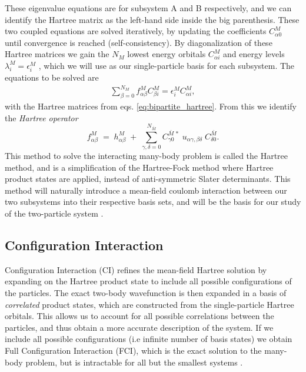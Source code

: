 \documentclass{subfiles}
\begin{document}
These eigenvalue equations are for subsystem A and B respectively, and we can identify the Hartree matrix as the left-hand side inside the big parenthesis. These two coupled equations are solved iteratively, by updating the coefficients $C_{\alpha 0}^M$ until convergence is reached (self-consistency). By diagonalization of these Hartree matrices we gain the $N_M$ lowest energy orbitals $C^M_{\alpha i}$ and energy levels $\lambda^M_i=\epsilon^M_i$ \cite{leinonen2024coulomb}, which we will use as our single-particle basis for each subsystem. The equations to be solved are
\begin{align}
    \sum_{\beta=0}^{N_M} f_{\alpha\beta}^M C^M_{\beta i} = \epsilon_i^M C^M_{\alpha i}\label{eq:hartree_eigenvalue},
\end{align}
with the Hartree matrices from eqs. \eqref{eq:bipartite_hartree}. From this we identify the \emph{Hartree operator}
\begin{equation}
    f_{\alpha\beta}^M \;=\; h_{\alpha\beta}^M
    \;+\;\sum_{\gamma,\delta=0}^{N_{\bar M}}
      C_{\gamma0}^{\bar M\,*}\;u_{\alpha\gamma,\beta\delta}\;C_{\delta0}^{\bar M}.
\label{eq:hartree_operator}
\end{equation}
This method to solve the interacting many-body problem is called the Hartree method, and is a simplification of the Hartree-Fock method where Hartree product states are applied, instead of anti-symmetric Slater determinants. This method will naturally introduce a mean-field coulomb interaction between our two subsystems into their respective basis sets, and will be the basis for our study of the two-particle system \cite{leinonen2024coulomb}.
\subsection{Configuration Interaction}\label{sec:CI}
Configuration Interaction (CI) refines the mean-field Hartree solution by expanding on the Hartree product state to include all possible configurations of the particles. The exact two-body wavefunction is then expanded in a basis of \emph{correlated} product states, which are constructed from the single-particle Hartree orbitals. This allows us to account for all possible correlations between the particles, and thus obtain a more accurate description of the system. If we include all possible configurations (i.e infinite number of basis states) we obtain Full Configuration Interaction (FCI), which is the exact solution to the many-body problem, but is intractable for all but the smallest systems \cite{helgaker2013molecular, szabo1996modern}. \\
\end{document}
